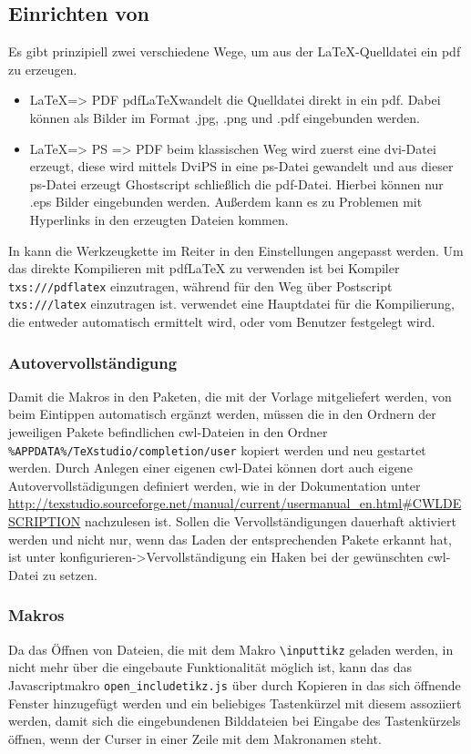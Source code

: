 \subsection{Einrichten von \Texstudio}
Es gibt prinzipiell zwei verschiedene Wege, um aus der \LaTeX-Quelldatei ein pdf zu erzeugen.
\begin{itemize}
	\item \LaTeX => PDF pdf\LaTeX wandelt die Quelldatei direkt in ein pdf.
	Dabei können als Bilder im Format .jpg, .png und .pdf eingebunden werden.
	\item \LaTeX => PS => PDF beim klassischen Weg wird zuerst eine dvi-Datei erzeugt, diese wird mittels DviPS in eine ps-Datei gewandelt und aus dieser ps-Datei erzeugt Ghostscript schließlich die pdf-Datei.
	Hierbei können nur .eps Bilder eingebunden werden.
	Außerdem kann es zu Problemen mit Hyperlinks in den erzeugten Dateien kommen.
\end{itemize}
In \Texstudio{} kann die Werkzeugkette im Reiter  in den Einstellungen angepasst werden.
Um das direkte Kompilieren mit pdf\LaTeX{} zu verwenden ist bei Kompiler \texttt{txs:///pdflatex} einzutragen, während für den Weg über Postscript \texttt{txs:///latex} einzutragen ist.
\Texstudio{} verwendet eine Hauptdatei für die Kompilierung, die entweder automatisch ermittelt wird, oder vom Benutzer festgelegt wird.

\subsubsection{Autovervollständigung}
Damit die Makros in den Paketen, die mit der Vorlage mitgeliefert werden, von \Texstudio{} beim Eintippen automatisch ergänzt werden, müssen die in den Ordnern der jeweiligen Pakete befindlichen cwl-Dateien in den Ordner \verb|%APPDATA%/TeXstudio/completion/user| kopiert werden und \Texstudio{} neu gestartet werden.
Durch Anlegen einer eigenen cwl-Datei können dort auch eigene Autovervollstädigungen definiert werden, wie in der Dokumentation unter \url{http://texstudio.sourceforge.net/manual/current/usermanual_en.html#CWLDESCRIPTION} nachzulesen ist.
Sollen die Vervollständigungen dauerhaft aktiviert werden und nicht nur, wenn \Texstudio{} das Laden der entsprechenden Pakete erkannt hat, ist unter \Texstudio{} konfigurieren->Vervollständigung ein Haken bei der gewünschten cwl-Datei zu setzen.

\subsubsection{Makros}
Da das Öffnen von Dateien, die mit dem Makro \texttt{\textbackslash{}inputtikz} geladen werden, in \Texstudio{} nicht mehr über die eingebaute Funktionalität möglich ist, kann das das Javascriptmakro \texttt{open\_includetikz.js} über  durch Kopieren in das sich öffnende Fenster hinzugefügt werden und ein beliebiges Tastenkürzel mit diesem assoziiert werden, damit sich die eingebundenen Bilddateien bei Eingabe des Tastenkürzels öffnen, wenn der Curser in einer Zeile mit dem Makronamen steht.

